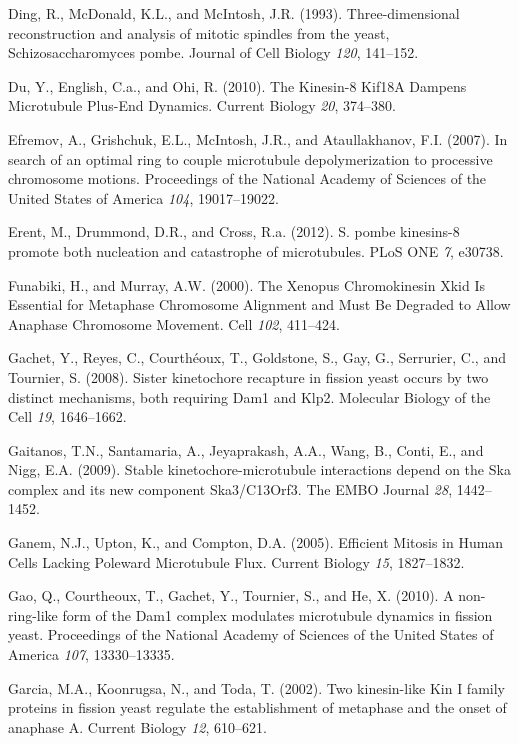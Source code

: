 \documentclass[12pt,a4paper,twoside,openright]{book}
\begin{document}
\hypertarget{ref-Ding1993a}{}
Ding, R., McDonald, K.L., and McIntosh, J.R. (1993). Three-dimensional
reconstruction and analysis of mitotic spindles from the yeast,
Schizosaccharomyces pombe. Journal of Cell Biology \emph{120}, 141--152.

\hypertarget{ref-Du2010}{}
Du, Y., English, C.a., and Ohi, R. (2010). The Kinesin-8 Kif18A Dampens
Microtubule Plus-End Dynamics. Current Biology \emph{20}, 374--380.

\hypertarget{ref-Efremov2007}{}
Efremov, A., Grishchuk, E.L., McIntosh, J.R., and Ataullakhanov, F.I.
(2007). In search of an optimal ring to couple microtubule
depolymerization to processive chromosome motions. Proceedings of the
National Academy of Sciences of the United States of America \emph{104},
19017--19022.

\hypertarget{ref-Erent2012}{}
Erent, M., Drummond, D.R., and Cross, R.a. (2012). S. pombe kinesins-8
promote both nucleation and catastrophe of microtubules. PLoS ONE
\emph{7}, e30738.

\hypertarget{ref-Funabiki2000}{}
Funabiki, H., and Murray, A.W. (2000). The Xenopus Chromokinesin Xkid Is
Essential for Metaphase Chromosome Alignment and Must Be Degraded to
Allow Anaphase Chromosome Movement. Cell \emph{102}, 411--424.

\hypertarget{ref-Gachet2008a}{}
Gachet, Y., Reyes, C., Courthéoux, T., Goldstone, S., Gay, G.,
Serrurier, C., and Tournier, S. (2008). Sister kinetochore recapture in
fission yeast occurs by two distinct mechanisms, both requiring Dam1 and
Klp2. Molecular Biology of the Cell \emph{19}, 1646--1662.

\hypertarget{ref-Gaitanos2009}{}
Gaitanos, T.N., Santamaria, A., Jeyaprakash, A.A., Wang, B., Conti, E.,
and Nigg, E.A. (2009). Stable kinetochore-microtubule interactions
depend on the Ska complex and its new component Ska3/C13Orf3. The EMBO
Journal \emph{28}, 1442--1452.

\hypertarget{ref-Ganem2005}{}
Ganem, N.J., Upton, K., and Compton, D.A. (2005). Efficient Mitosis in
Human Cells Lacking Poleward Microtubule Flux. Current Biology
\emph{15}, 1827--1832.

\hypertarget{ref-Gao2010}{}
Gao, Q., Courtheoux, T., Gachet, Y., Tournier, S., and He, X. (2010). A
non-ring-like form of the Dam1 complex modulates microtubule dynamics in
fission yeast. Proceedings of the National Academy of Sciences of the
United States of America \emph{107}, 13330--13335.

\hypertarget{ref-Garcia2002d}{}
Garcia, M.A., Koonrugsa, N., and Toda, T. (2002). Two kinesin-like Kin I
family proteins in fission yeast regulate the establishment of metaphase
and the onset of anaphase A. Current Biology \emph{12}, 610--621.
\end{document}
